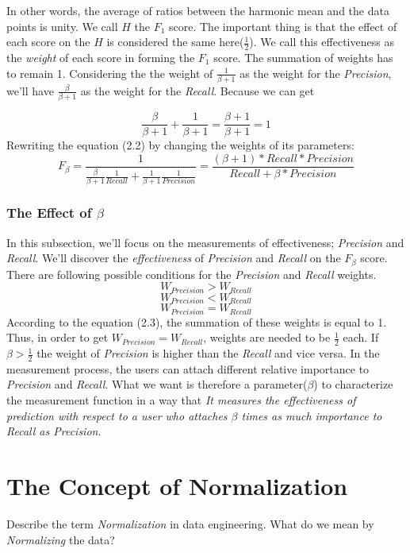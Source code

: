 \documentclass[12pt]{article}
\numberwithin{equation}{section}
\numberwithin{table}{section}
\numberwithin{figure}{section}
\begin{document}
In other words, the average of ratios between the harmonic mean and the data points is unity.
We call $H$ the $F_{1}$ score. The important thing is that the effect of each score on the $H$ is considered the same here($\frac{1}{2}$). We call this effectiveness as the \textit{weight} of each score in forming the $F_{1}$ score. The summation of weights has to remain 1. Considering the the weight of $\frac{1}{\beta + 1}$ as the weight for the \textit{Precision}, we'll have $\frac{\beta}{\beta + 1}$ as the weight for the \textit{Recall}. Because we can get

$$
	\frac{\beta}{\beta + 1} + \frac{1}{\beta + 1} = \frac{\beta + 1}{\beta + 1} = 1
$$
Rewriting the equation (2.2) by changing the weights of its parameters:
\begin{equation}
	F_{\beta} = \frac{1}{\frac{\beta}{\beta + 1}\frac{1}{Recall} + \frac{1}{\beta + 1}\frac{1}{Precision}} = \frac{(\beta + 1) * Recall * Precision}{Recall + \beta*Precision}
\end{equation}
\subsubsection*{The Effect of $\beta$}
In this subsection, we'll focus on the measurements of effectiveness; \textit{Precision} and \textit{Recall}. We'll discover the \textit{effectiveness} of \textit{Precision} and \textit{Recall} on the $F_{\beta}$ score.
There are following possible conditions for the \textit{Precision} and \textit{Recall} weights.
$$
	W_{Precision} > W_{Recall}
$$
$$
	W_{Precision} < W_{Recall}
$$ 
$$ 
	W_{Precision} = W_{Recall}
$$
According to the equation (2.3), the summation of these weights is equal to 1. Thus, in order to get $ W_{Precision} = W_{Recall}$, weights are needed to be $\frac{1}{2}$ each. If $\beta > \frac{1}{2}$ the weight of \textit{Precision} is higher than the \textit{Recall} and vice versa.
In the measurement process, the users can attach different relative importance to \textit{Precision} and \textit{Recall}. What we want is therefore a parameter(\textit{$\beta$}) to characterize the measurement function in a way that \textit{It measures the effectiveness of prediction with respect to a user who attaches $\beta$ times as much importance to Recall as Precision}.

\section{The Concept of Normalization}
Describe the term \textit{Normalization} in data engineering. What do we mean by \textit{Normalizing} the data?
\end{document}
